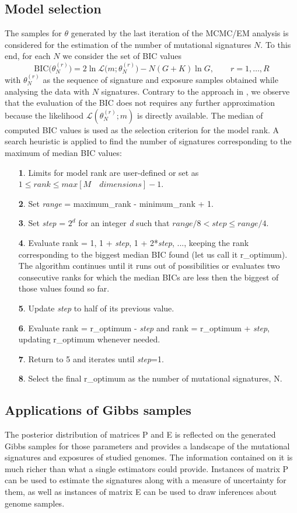 \documentclass{bioinfo}
\begin{document}
\subsection{Model selection}
The samples for $\theta$ generated by the last iteration of the
MCMC/EM analysis is considered for the estimation of the number 
of mutational signatures $N$. To this end, for each $N$ we consider
the set of BIC values
\[
  \text{BIC}\big(\theta^{(r)}_N\big) = 2\ln\mathcal L\big(m;
    \theta^{(r)}_{N}\big) - N(G+K)\ln G, \qquad r =1, \ldots,
    R
\]
with $\theta^{(r)}_N$ as the sequence of signature and exposure 
samples obtained while analysing the  data with $N$
signatures. Contrary to the approach in \cite{FICMV}, we observe that
the evaluation of the BIC does not requires any further approximation
because the likelihood $\mathcal L(\theta^{(r)}_N; m)$ is directly
available. The median of computed BIC values is used as the selection 
criterion for the model rank. A search heuristic is applied to find 
the number of signatures corresponding to the maximum of median BIC 
values: 
\begin{enumerate}
\item[\textbf{1}.] Limits for model rank are user-defined or set as 
$1\leqslant rank \leqslant max[M\quad dimensions]-1$.
\item[\textbf{2}.] Set \textit{range} = maximum\_rank - minimum\_rank + 1.
\item[\textbf{3}.] Set \textit{step} = $2^d$ for an integer \textit{d} such that 
$range/8 < step \leqslant range/4$.
\item[\textbf{4}.] Evaluate rank = 1, 1 + \textit{step}, 1 + 2*\textit{step}, ..., 
keeping the rank corresponding to the biggest median BIC found 
(let us call it r\_optimum). The algorithm continues until it runs 
out of possibilities or evaluates two consecutive ranks for which the 
median BICs are less then the biggest of those values found so far.
\item[\textbf{5}.] Update \textit{step} to half of its previous value.
\item[\textbf{6}.] Evaluate rank = r\_optimum - \textit{step} and 
rank = r\_optimum + \textit{step}, updating r\_optimum whenever needed.
\item[\textbf{7}.] Return to 5 and iterates until \textit{step}=1.
\item[\textbf{8}.] Select the final r\_optimum as the number of mutational 
signatures, N.
\end{enumerate}

\subsection{Applications of Gibbs samples} 
The posterior distribution of matrices P and E is reflected on the generated 
Gibbs samples for those parameters and provides a landscape of the mutational 
signatures and exposures of studied genomes. The information contained on it 
is much richer than what a single estimators could provide. Instances of matrix 
P can be used to estimate the signatures along with a measure of uncertainty for 
them, as well as instances of matrix E can be used to draw inferences about 
genome samples.
\end{document}
